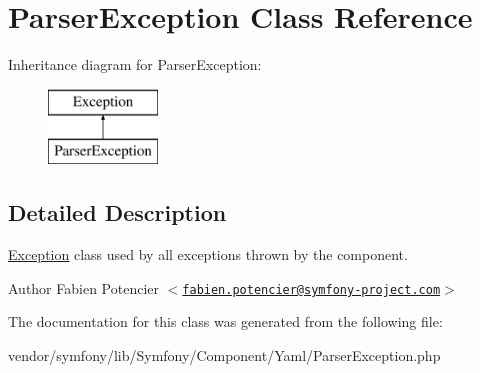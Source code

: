 \hypertarget{class_symfony_1_1_component_1_1_yaml_1_1_parser_exception}{
\section{\-Parser\-Exception \-Class \-Reference}
\label{class_symfony_1_1_component_1_1_yaml_1_1_parser_exception}
}
\-Inheritance diagram for \-Parser\-Exception\-:\begin{figure}[H]
\begin{center}
\leavevmode
\includegraphics[height=2.000000cm]{class_symfony_1_1_component_1_1_yaml_1_1_parser_exception}
\end{center}
\end{figure}


\subsection{\-Detailed \-Description}
\hyperlink{class_symfony_1_1_component_1_1_yaml_1_1_exception}{\-Exception} class used by all exceptions thrown by the component.

\begin{DoxyAuthor}{\-Author}
\-Fabien \-Potencier $<$\href{mailto:fabien.potencier@symfony-project.com}{\tt fabien.\-potencier@symfony-\/project.\-com}$>$ 
\end{DoxyAuthor}


\-The documentation for this class was generated from the following file\-:\begin{DoxyCompactItemize}
\item 
vendor/symfony/lib/\-Symfony/\-Component/\-Yaml/\-Parser\-Exception.\-php\end{DoxyCompactItemize}
